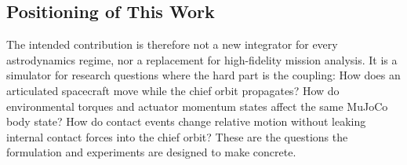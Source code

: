 \subsection{Positioning of This Work}

The intended contribution is therefore not a new integrator for every
astrodynamics regime, nor a replacement for high-fidelity mission analysis.
It is a simulator for research questions where the hard part is the coupling:
How does an articulated spacecraft move while the chief orbit propagates?
How do environmental torques and actuator momentum states affect the same
MuJoCo body state? How do contact events change relative motion without
leaking internal contact forces into the chief orbit? These are the questions
the formulation and experiments are designed to make concrete.
